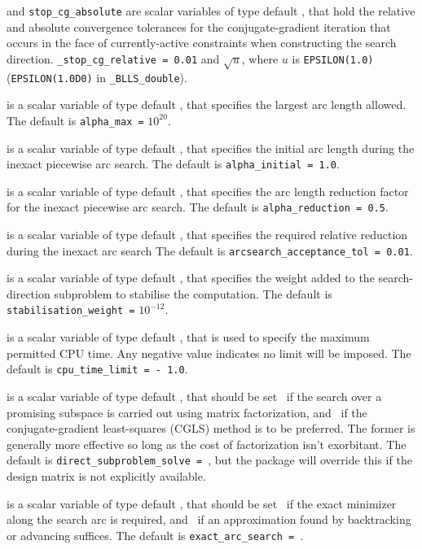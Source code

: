 \documentclass{galahad}
\newcommand{\packagename}{BLLS}
\newcommand{\fullpackagename}{\libraryname\_\packagename}
\begin{document}
\begin{description}
 and {\tt stop\_cg\_absolute}
are scalar variables of type default \realdp,
that hold the relative and absolute convergence tolerances for the
conjugate-gradient iteration that occurs in the face of currently-active
constraints when constructing the search direction.
{\tt \_stop\_cg\_relative = 0.01}
and  $\sqrt{u}$,
where $u$ is {\tt EPSILON(1.0)} ({\tt EPSILON(1.0D0)} in
{\tt \fullpackagename\_double}).

 is a scalar variable of type default \realdp, that specifies
the largest arc length allowed.
The default is {\tt alpha\_max =} $10^{20}$.

 is a scalar variable of type default \realdp, that
specifies the initial arc length during the inexact piecewise arc search.
The default is {\tt alpha\_initial = 1.0}.

 is a scalar variable of type default \realdp, that
specifies the arc length reduction factor for the inexact piecewise arc search.
The default is {\tt alpha\_reduction = 0.5}.

 is a scalar variable of type default \realdp,
that specifies the required relative reduction during the inexact arc search
The default is {\tt arcsearch\_acceptance\_tol = 0.01}.

 is a scalar variable of type default \realdp,
that specifies the weight added to the search-direction subproblem to 
stabilise the computation.
The default is {\tt stabilisation\_weight =} $10^{-12}$.

 is a scalar variable of type default \realdp,
that is used to specify the maximum permitted CPU time. Any negative
value indicates no limit will be imposed. The default is
{\tt cpu\_time\_limit = - 1.0}.

 is a scalar variable of type default \logical,
that should be set \true\ if the search over a promising subspace is
carried out using matrix factorization, and \false\ if the conjugate-gradient
least-squares (CGLS) method is to be preferred. The former is generally
more effective so long as the cost of factorization isn't exorbitant.
The default is {\tt direct\_subproblem\_solve = \true}, but the
package will override this if the design matrix is not explicitly available.

 is a scalar variable of type default \logical,
that should be set \true\ if the exact minimizer along the search arc is
required, and \false\ if an approximation found by backtracking or
advancing suffices.
The default is {\tt exact\_arc\_search = \true}.


\end{description}
\end{document}
